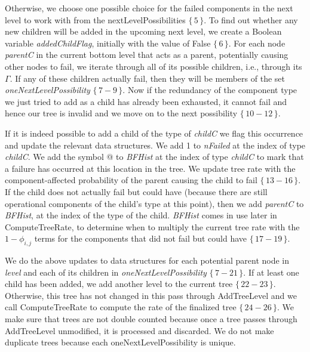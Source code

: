 \documentclass[12pt]{article}
\newcommand{\citeLine}[1]{$\{\,#1\,\}$}
\newcommand{\citeBlock}[2]{$\{\,#1 - #2\,\}$}
\begin{document}
Otherwise, we choose one possible choice for the failed components in the next level to work with from the nextLevelPossibilities \citeLine{5}. To find out whether any new children will be added in the upcoming next level, we create a Boolean variable \textit{addedChildFlag}, initially with the value of False \citeLine{6}. For each node \textit{parentC} in the current bottom level that acts as a parent, potentially causing other nodes to fail, we iterate through all of its possible children, i.e., through its $\Gamma$. If any of these children actually fail, then they will be members of the set \textit{oneNextLevelPossibility} \citeBlock{7}{9}. Now if the redundancy of the component type we just tried to add as a child has already been exhausted, it cannot fail and hence our tree is invalid and we move on to the next possibility \citeBlock{10}{12}.

If it is indeed possible to add a child of the type of \textit{childC} we flag this occurrence and update the relevant data structures. We add 1 to \textit{nFailed} at the index of type \textit{childC}. We add the symbol @ to \textit{BFHist} at the index of type \textit{childC} to mark that a failure has occurred at this location in the tree. We update tree rate with the component-affected probability of the parent causing the child to fail \citeBlock{13}{16}. If the child does not actually fail but could have (because there are still operational components of the child's type at this point), then we add \textit{parentC} to \textit{BFHist}, at the index of the type of the child. \textit{BFHist} comes in use later in ComputeTreeRate, to determine when to multiply the current tree rate with the $1-\phi_{i,j}$ terms for the components that did not fail but could have \citeBlock{17}{19}.

We do the above updates to data structures for each potential parent node in \textit{level} and each of its children in \textit{oneNextLevelPossibility} \citeBlock{7}{21}. If at least one child has been added, we add another level to the current tree \citeBlock{22}{23}. Otherwise, this tree has not changed in this pass through AddTreeLevel and we call ComputeTreeRate to compute the rate of the finalized tree \citeBlock{24}{26}. We make sure that trees are not double counted because once a tree passes through AddTreeLevel unmodified, it is processed and discarded. We do not make duplicate trees because each oneNextLevelPossibility is unique.
\end{document}
